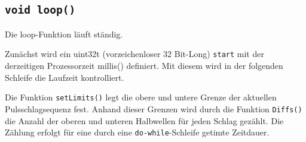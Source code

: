 \documentclass[10pt, a4paper]{article}
\begin{document}
\subsection{\texttt{void loop()}}
Die loop-Funktion läuft ständig.

Zunächst wird ein uint32\textunderscore t (vorzeichenloser 32 Bit-Long) \texttt{start} mit der derzeitigen Prozessorzeit millis() definiert. Mit diesem wird in der folgenden Schleife die Laufzeit kontrolliert.

Die Funktion \texttt{setLimits()} legt die obere und untere Grenze der aktuellen Pulsschlagsequenz fest.
Anhand dieser Grenzen wird durch die Funktion \texttt{Diffs()} die Anzahl der oberen und unteren Halbwellen für jeden Schlag gezählt. Die Zählung erfolgt für eine durch eine \texttt{do-while}-Schleife getimte Zeitdauer.
\end{document}
